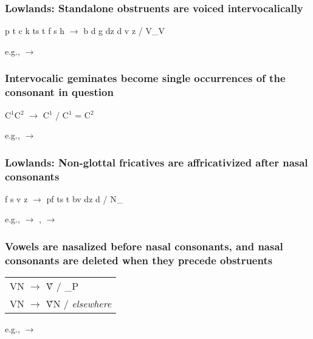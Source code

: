 \subsubsection{{\sc Lowlands:} Standalone obstruents are voiced intervocalically} 

\begin{center}
    p t c k t\tiebar s t\tiebar\esh{} f s \esh{} h $\to$ b d \paljstop{} g d\tiebar z d\tiebar\ezh{} v z \ezh{} \voih{} / V\_V
\end{center}

e.g.,   $\to$  

\subsubsection{Intervocalic geminates become single occurrences of the consonant in question}

\begin{center}
    C$^1$C$^2$ $\to$ C$^1$ / C$^1$ = C$^2$
\end{center}

e.g.,   $\to$ 

\subsubsection{{\sc Lowlands:} Non-glottal fricatives are affricativized after nasal consonants}

\begin{center}
    f s \esh{} v z \ezh{} $\to$ p\tiebar f t\tiebar s t\tiebar\esh{} b\tiebar v d\tiebar z d\tiebar\ezh{} / N\_ 
\end{center}

e.g.,   $\to$ ,   $\to$ 

\subsubsection{Vowels are nasalized before nasal consonants, and nasal consonants are deleted when they precede obstruents}

\begin{center}
    \begin{tabular}{l}
        VN $\to$ \~{V} / \_P \\
        VN $\to$ \~{V}N / \emph{elsewhere}
    \end{tabular}
\end{center}

e.g.,   $\to$ 